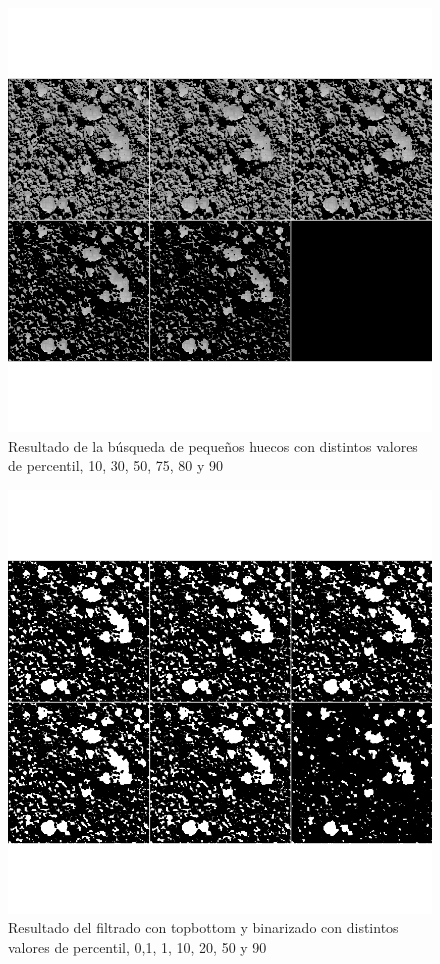 \begin{figure}[h!]
    \includegraphics[width=\textwidth]{Imagenes/Resultados script morfologico/GS07.png}
     \hfill
     \caption{Resultado de la búsqueda de pequeños huecos con distintos valores de percentil, 10, 30, 50, 75, 80 y 90 }
    \label{pequenoshuecos}
\end{figure}

\begin{figure}[h!]
    \includegraphics[width=\textwidth]{Imagenes/Resultados script morfologico/GS09.png}
     \hfill
     \caption{Resultado del filtrado con topbottom y binarizado con distintos valores de percentil, 0,1, 1, 10, 20, 50 y 90 }
    \label{topbottom}
\end{figure}